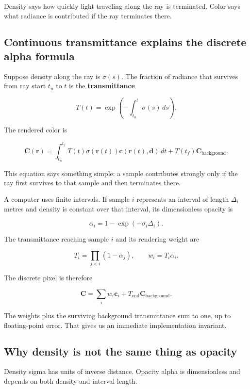 Density says how quickly light traveling along the ray is terminated. Color says what radiance is contributed if the ray terminates there.

\subsection{Continuous transmittance explains the discrete alpha formula}\label{04-visual-computing-ii-ch035-continuous-transmittance-explains-the-discrete-alpha-formula}

Suppose density along the ray is \(\sigma(s)\). The fraction of radiance that survives from ray start \(t_n\) to \(t\) is the \textbf{transmittance}

\[T(t)=\exp\left(-\int_{t_n}^{t}\sigma(s)\,ds\right).\]

The rendered color is

\[\mathbf C(\mathbf r)=\int_{t_n}^{t_f}T(t)\sigma(\mathbf r(t))\mathbf c(\mathbf r(t),\mathbf d)\,dt+T(t_f)\mathbf C_{\mathrm{background}}.\]

This equation says something simple: a sample contributes strongly only if the ray first survives to that sample and then terminates there.

A computer uses finite intervals. If sample \(i\) represents an interval of length \(\Delta_i\) metres and density is constant over that interval, its dimensionless opacity is

\[\alpha_i=1-\exp(-\sigma_i\Delta_i).\]

The transmittance reaching sample \(i\) and its rendering weight are

\[T_i=\prod_{j<i}(1-\alpha_j),\qquad w_i=T_i\alpha_i.\]

The discrete pixel is therefore

\[\mathbf C=\sum_iw_i\mathbf c_i+T_{\mathrm{end}}\mathbf C_{\mathrm{background}}.\]

The weights plus the surviving background transmittance sum to one, up to floating-point error. That gives us an immediate implementation invariant.

\subsection{Why density is not the same thing as opacity}\label{04-visual-computing-ii-ch035-why-density-is-not-the-same-thing-as-opacity}

Density sigma has units of inverse distance. Opacity alpha is dimensionless and depends on both density and interval length.

